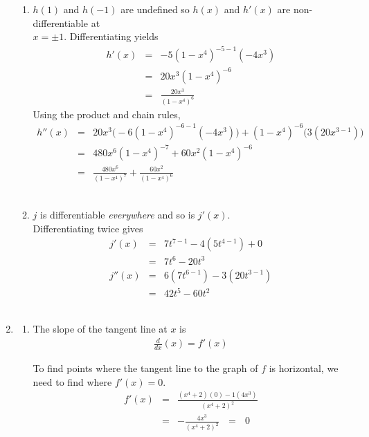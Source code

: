 \documentclass[12pt]{amsart}
\begin{document}
\begin{enumerate}
\begin{enumerate}
			\item $h(1)$ and $h(-1)$ are undefined so $h(x)$ and $h'(x)$ are non-differentiable at \\
			$x=\pm1$. Differentiating yields
				\begin{eqnarray}
					h'(x) & = & -5(1-x^4)^{-5-1}(-4x^3) \nonumber \\
					& = & 20x^3(1-x^4)^{-6} \nonumber \\
					& = & \frac{20x^3}{(1-x^4)^6} \nonumber
				\end{eqnarray}
			Using the product and chain rules,
				\begin{eqnarray}
					h''(x) & = & 20x^3\big(-6(1-x^4)^{-6-1}(-4x^3)\big)+(1-x^4)^{-6}\big(3(20x^{3-1})\big) 					\nonumber \\
					& = & 480x^6(1-x^4)^{-7}+60x^2(1-x^4)^{-6} \nonumber \\
					& = & \frac{480x^6}{(1-x^4)^7}+\frac{60x^2}{(1-x^4)^6} \nonumber
				\end{eqnarray} \\
				
			\item	$j$ is differentiable \emph{everywhere} and so is $j'(x)$. \\
			Differentiating twice gives
			\begin{eqnarray}
				j'(x) & = & 7t^{7-1}-4(5t^{4-1})+0 \nonumber \\
				& = & 7t^6-20t^3 \nonumber \\
				j''(x) & = & 6(7t^{6-1})-3(20t^{3-1}) \nonumber \\
				& = & 42t^5-60t^2 \nonumber
			\end{eqnarray} \\
					
		\end{enumerate}
	
	\item
	
		\begin{enumerate}
				
			\item The slope of the tangent line at $x$ is 
				\begin{eqnarray}
					\frac{ d}{ dx} \left(x \right) = f'(x) \nonumber
				\end{eqnarray}
				
			\medskip
			To find points where the tangent line to the graph of $f$ is horizontal, we need to find where 				$f'(x)=0$.
				\begin{eqnarray}
					f'(x) & = & \frac{(x^4+2)(0)-1(4x^3)}{(x^4+2)^2} \nonumber \\
					& = & -\frac{4x^3}{(x^4+2)^2} \text{ } = \text{ } 0 \nonumber
				\end{eqnarray}
				

\end{enumerate}
\end{enumerate}
\end{document}
